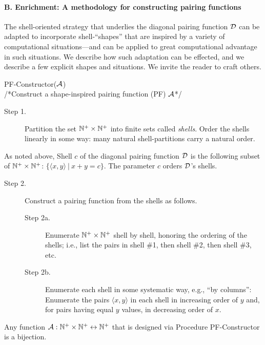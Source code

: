 \paragraph{\small\sf B. Enrichment: A methodology for constructing pairing functions}

The shell-oriented strategy that underlies the diagonal pairing
function $\mbox{$\cal D$}$ can be adapted to incorporate shell-``shapes'' that are
inspired by a variety of computational situations---and can be applied
to great computational advantage in such situations.  We describe how
such adaptation can be effected, and we describe a few explicit shapes
and situations.  We invite the reader to craft others.

\medskip

 {\small\sf PF-Constructor}($\mbox{$\cal A$}$) \\
/*Construct a shape-inspired pairing function (PF) $\mbox{$\cal A$}$*/
\begin{description}
\item[Step 1.]
%
Partition the set $\mathbb{N}^+ \times \mathbb{N}^+$ into finite sets called {\it
  shells}.  Order the shells linearly in some way: many natural
shell-partitions carry a natural order.
\end{description}
As noted above, Shell $c$ of the diagonal pairing function $\mbox{$\cal D$}$ is the
following subset of $\mathbb{N}^+ \times \mathbb{N}^+$: $\{ \langle x,y \rangle \ |
\ x+y = c \}$.  The parameter $c$ orders $\mbox{$\cal D$}$'s shells.

\begin{description}
\item[Step 2.]
Construct a pairing function from the shells as follows.
  \begin{description}
  \item[Step 2a.]
Enumerate $\mathbb{N}^+ \times \mathbb{N}^+$ shell by shell, honoring the ordering of
the shells; i.e., list the pairs in shell \#1, then shell \#2, then
shell \#3, etc.
  \item[Step 2b.]
Enumerate each shell in some systematic way, e.g., ``by columns'':
Enumerate the pairs $\langle x,y \rangle$ in each shell in increasing
order of $y$ and, for pairs having equal $y$ values, in decreasing
order of $x$.
  \end{description}
\end{description}

\begin{prop}
\label{thm:PF-construct}
Any function $\mbox{$\cal A$}: \mathbb{N}^+ \times \mathbb{N}^+ \leftrightarrow \mathbb{N}^+$ that is
designed via Procedure {\small\sf PF-Constructor} is a bijection.
\end{prop}

